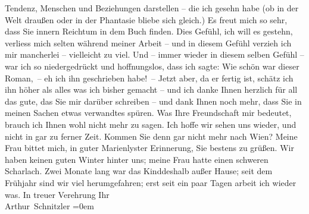 \begin{ledgroupsized}[t]{13cm}
               Tendenz, {\pb}Menschen und Beziehungen darstellen –
               die ich gesehn habe (ob in der Welt draußen oder in der Phantasie bliebe sich
               gleich.)  Es freut mich so sehr, dass Sie
               innern Reichtum in dem Buch
               finden. Dies Gefühl, ich will es gestehn, verliess mich selten während meiner Arbeit
               – und in diesem Gefühl verzieh ich mir mancherlei – vielleicht zu viel. Und \introOben{}–\introOben{} immer wieder in diesem selben Gefühl – war ich so
               niedergedrückt und hoffnungslos, dass ich sagte: Wie schön war dieser Roman, – eh ich
               ihn geschrieben habe! – Jetzt aber, da er fertig ist, schätz ich ihn höher als alles
               was ich bisher gemacht – und ich danke Ihnen herzlich für all das gute, das Sie mir
                  {\pb}darüber schreiben – und dank Ihnen noch mehr,
               dass Sie in meinen Sachen etwas verwandtes spüren. Was Ihre Freundschaft mir
               bedeutet, brauch ich Ihnen wohl nicht mehr zu sagen. Ich hoffe wir sehen uns wieder,
               und nicht in gar zu ferner Zeit. Kommen Sie denn gar nicht mehr nach Wien?\pend
           \pstart
           Meine Frau bittet mich, in
               guter Marienlyster Erinnerung, Sie bestens zu
               grüßen. Wir haben keinen guten Winter hinter uns; meine Frau hatte einen schweren Scharlach. Zwei
               Monate lang war das Kind\introOben{}deshalb\introOben{} außer Hause; seit dem Frühjahr sind wir viel
               herumgefahren; erst seit ein paar Tagen arbeit ich wieder was.\pend
           \pstart
           In treuer Verehrung Ihr{\\[\baselineskip]}\spacefill\mbox{Arthur Schnitzler}\pend
           \leftskip=0em{}
         
         \endnumbering{}\end{ledgroupsized}  \newcommand{\dateiname}{L01779}\newcommand{\titel}{Arthur Schnitzler an Georg Brandes, 4. 7. 1908}\newcommand{\editorInnen}{Martin Anton Müller und Gerd-Hermann Susen}
      